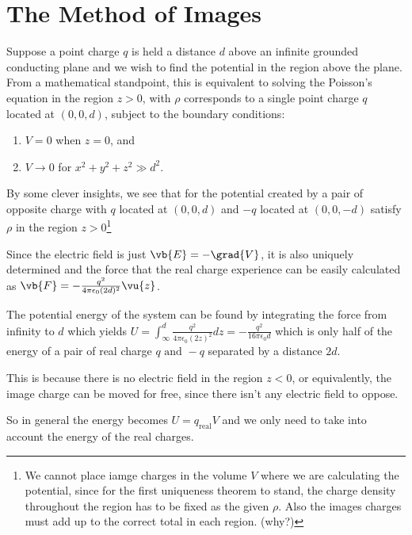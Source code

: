 \documentclass[english,a4paper,12pt]{report}
\begin{document}
\section{The Method of Images}

Suppose a point charge \(q\) is held a distance \(d\) above an infinite grounded conducting plane and we wish to find the potential in the region above the plane. From a mathematical standpoint, this is equivalent to solving the Poisson's equation in the region \(z > 0\), with \(\rho \) corresponds to a single point charge  \(q\) located at \((0,0,d )\), subject to the boundary conditions: 
\begin{enumerate}
    \item \(V = 0\) when \(z = 0\), and
    \item \(V \rightarrow 0\) for \(x^2 + y^2 + z^2 \gg d^2\).	
\end{enumerate}

By some clever insights, we see that for the potential created by a pair of opposite charge with \(q\) located at \((0,0,d)\) and \(-q\) located at \((0,0,-d)\) satisfy \(\rho \) in the region \(z > 0\)\footnote{We cannot place iamge charges in the volume \(V\) where we are calculating the potential, since for the first uniqueness theorem to stand, the charge density throughout the region has to be fixed as the given \(\rho \). Also the images charges must add up to the correct total in each region. (why?)} 

Since the electric field is just \(\vb{E} = -\grad{V} \), it is also uniquely determined and the force that the real charge experience can be easily calculated as \( \vb{F} = -\frac{q^2}{4\pi \epsilon _{0} (2d)^2} \vu{z}  \).

The potential energy of the system can be found by integrating the force from infinity to \(d\) which yields \( U = \int_{\infty}^{d}  \frac{q^2}{4\pi \epsilon _{0} (2z)^2} dz = -\frac{q^2}{16\pi \epsilon _{0} d}  \) which is only half of the energy of a pair of real charge \(q \text{ and }  -q\) separated by a distance \(2d\). 

This is because there is no electric field in the region \(z < 0\), or equivalently, the image charge can be moved for free, since there isn't any electric field to oppose. 

So in general the energy becomes \(U = q_{\text{real} } V \) and we only need to take into account the energy of the real charges. 
\end{document}
